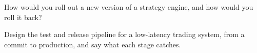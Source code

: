 \begin{interviewq}\label{iq:ll:testing-and-deploying-low-latency-systems:5}
How would you roll out a new version of a strategy engine, and how would you roll it back?
\end{interviewq}

\begin{interviewq}\label{iq:ll:testing-and-deploying-low-latency-systems:6}
Design the test and release pipeline for a low-latency trading system, from a commit to production, and say what each stage
catches.
\end{interviewq}
